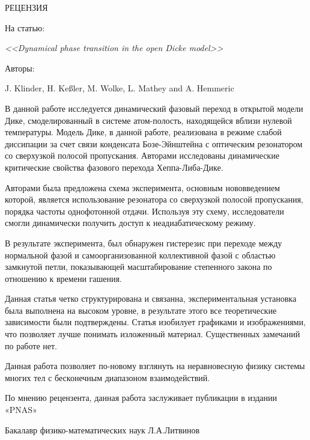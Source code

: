 \pagestyle{empty}
\begin{center}
    \MakeUppercase{РЕЦЕНЗИЯ}

    На статью:

    \textit{<<Dynamical phase transition in the open Dicke model>>}

    Авторы:

    J. Klinder, H. Keßler, M. Wolke, L. Mathey and A. Hemmeric
\end{center}

\vfill

В данной работе исследуется динамический фазовый переход в открытой модели Дике, смоделированный в системе атом-полость, находящейся вблизи нулевой температуры. Модель Дике, в данной работе, реализована в режиме слабой диссипации за счет связи конденсата Бозе-Эйнштейна с оптическим резонатором со сверхузкой полосой пропускания. Авторами исследованы динамические критические свойства фазового перехода Хеппа-Либа-Дике.

Авторами была предложена схема эксперимента, основным нововведением которой, является использование резонатора со сверхузкой полосой пропускания, порядка частоты однофотонной отдачи. Используя эту схему, исследователи смогли динамически получить доступ к неадиабатическому режиму.

В результате эксперимента, был обнаружен гистерезис при переходе между нормальной фазой и самоорганизованной коллективной фазой с областью замкнутой петли, показывающей масштабирование степенного закона по отношению к времени гашения.

Данная статья четко структурирована и связанна, экспериментальная установка была выполнена на высоком уровне, в результате этого все теоретические зависимости были подтверждены. Статья изобилует графиками и изображениями, что позволяет лучше понимать изложенный материал. Существенных замечаний по работе нет.

Данная работа позволяет по-новому взглянуть на неравновесную физику системы многих тел с бесконечным диапазоном взаимодействий.

По мнению рецензента, данная работа заслуживает публикации в издании «PNAS»


\vfill\vfill\vfill

Бакалавр физико-математических наук \qquad\qquad\qquad\qquad\qquad\qquad\qquad Л.А.Литвинов

\vfill
\vfill

